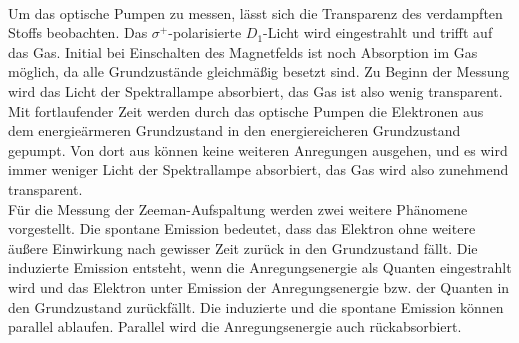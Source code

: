 %
%
\\Um das optische Pumpen zu messen, lässt sich die Transparenz des verdampften Stoffs beobachten.
Das $\sigma^{+}$-polarisierte $D_{1}$-Licht wird eingestrahlt und trifft auf das Gas.
Initial bei Einschalten des Magnetfelds ist noch Absorption im Gas möglich, da alle Grundzustände gleichmäßig besetzt sind.
Zu Beginn der Messung wird das Licht der Spektrallampe absorbiert, das Gas ist also wenig transparent.
Mit fortlaufender Zeit werden durch das optische Pumpen die Elektronen aus dem energieärmeren Grundzustand in den energiereicheren Grundzustand gepumpt.
Von dort aus können keine weiteren Anregungen ausgehen, und es wird immer weniger Licht der Spektrallampe absorbiert, das Gas wird also zunehmend transparent.
%
%
\\Für die Messung der Zeeman-Aufspaltung werden zwei weitere Phänomene vorgestellt.
Die spontane Emission bedeutet, dass das Elektron ohne weitere äußere Einwirkung nach gewisser Zeit zurück in den Grundzustand fällt.
Die induzierte Emission entsteht, wenn die Anregungsenergie als Quanten eingestrahlt wird und das Elektron unter Emission der Anregungsenergie bzw. der Quanten in den Grundzustand zurückfällt.
Die induzierte und die spontane Emission können parallel ablaufen.
Parallel wird die Anregungsenergie auch rückabsorbiert.
